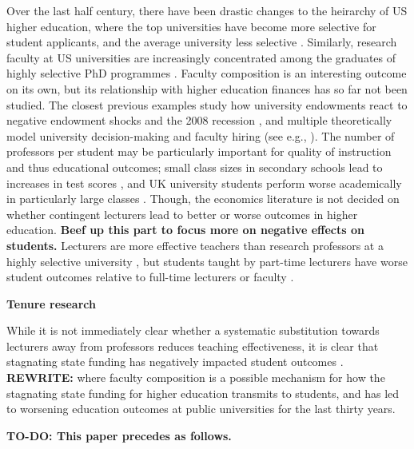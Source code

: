 Over the last half century, there have been drastic changes to the heirarchy of US higher education, where the top universities have become more selective for student applicants, and the average university less selective \citep{hoxby2009changing}.
Similarly, research faculty at US universities are increasingly concentrated among the graduates of highly selective PhD programmes \citep{wapman2022quantifying}.
Faculty composition is an interesting outcome on its own, but its relationship with higher education finances has so far not been studied.
The closest previous examples study  how university endowments react to negative endowment shocks \citep{brown2014endowment} and the 2008 recession \citep{turner2014impact}, and multiple theoretically model university decision-making and faculty hiring (see e.g., \citealt{abe2015implications,johnson2009jep,NBERc13879}).
The number of professors per student may be particularly important for quality of instruction and thus educational outcomes;
small class sizes in secondary schools lead to increases in test scores \citep{angrist1999using}, and UK university students perform worse academically in particularly large classes \citep{bandiera2010heterogeneous}.
Though, the economics literature is not decided on whether contingent lecturers lead to better or worse outcomes in higher education.
\textbf{Beef up this part to focus more on negative effects on students.}
Lecturers are more effective teachers than research professors at a highly selective university \citep{bettinger2010does,figlio2015tenure}, but students taught by part-time lecturers have worse student outcomes relative to full-time lecturers or faculty \citep{zhu2021limited,ehrenberg2005tenured,jaeger2011examining}.

\textbf{Tenure research \citep{mcpherson1999tenure,mcpherson1983economics}}

While it is not immediately clear whether a systematic substitution towards lecturers away from professors reduces teaching effectiveness, it is clear that stagnating state funding has negatively impacted student outcomes \citep{NBERw23736,NBERw27885}.
\textbf{REWRITE:} where faculty composition is a possible mechanism for how the stagnating state funding for higher education transmits to students, and has led to worsening education outcomes at public universities for the last thirty years.


\textbf{TO-DO:
    This paper precedes as follows.
}
